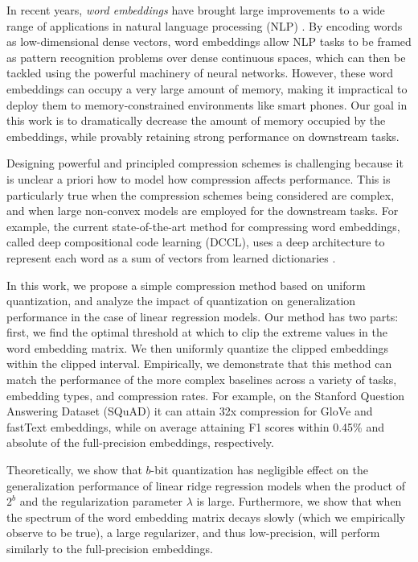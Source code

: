 In recent years, \textit{word embeddings} \citep{word2vec13,glove14,fasttext18} have brought large improvements to a wide range of applications in natural language processing (NLP) \citep{collins16,drqa17}.
By encoding words as low-dimensional dense vectors, word embeddings allow NLP tasks to be framed as pattern recognition problems over dense continuous spaces, which can then be tackled using the powerful machinery of neural networks.
However, these word embeddings can occupy a very large amount of memory, making it impractical to deploy them to memory-constrained environments like smart phones.
Our goal in this work is to dramatically decrease the amount of memory occupied by the embeddings, while provably retaining strong performance on downstream tasks.

Designing powerful and principled compression schemes is challenging because it is unclear a priori how to model how compression affects performance.
This is particularly true when the compression schemes being considered are complex, and when large non-convex models are employed for the downstream tasks.
For example, the current state-of-the-art method for compressing word embeddings, called deep compositional code learning (DCCL), uses a deep architecture to represent each word as a sum of vectors from learned dictionaries \citep{dccl17}.

In this work, we propose a simple compression method based on uniform quantization, and analyze the impact of quantization on generalization performance in the case of linear regression models.
Our method has two parts: first, we find the optimal threshold at which to clip the extreme values in the word embedding matrix.  We then uniformly quantize the clipped embeddings within the clipped interval.
Empirically, we demonstrate that this method can match the performance of the more complex baselines across a variety of tasks, embedding types, and compression rates.
For example, on the Stanford Question Answering Dataset (SQuAD) \citep{squad16} it can attain 32x compression for GloVe and fastText embeddings, while on average attaining F1 scores within 0.45\% and  absolute of the full-precision embeddings, respectively.

Theoretically, we show that $b$-bit quantization has negligible effect on the generalization performance of linear ridge regression models when the product of $2^b$ and the regularization parameter $\lambda$ is large.
Furthermore, we show that when the spectrum of the word embedding matrix decays slowly (which we empirically observe to be true), a large regularizer, and thus low-precision, will perform similarly to the full-precision embeddings.

